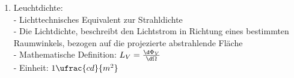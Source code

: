\documentclass[ex]{exercise}
\begin{document}
\begin{enumerate}
\begin{enumerate}
        \item Leuchtdichte: \\
        - Lichttechnisches Equivalent zur Strahldichte\\
        - Die Lichtdichte, beschreibt den Lichtstrom in Richtung eines bestimmten Raumwinkels, bezogen 
        auf die projezierte abstrahlende Fläche \\
        - Mathematische Definition: \(L_V = \frac{\d\Phi_V}{\d\Omega}\)\\
        - Einheit: \(1 \ufrac{cd}{m^2}\)
    \end{enumerate}
\end{enumerate}
\end{document}
